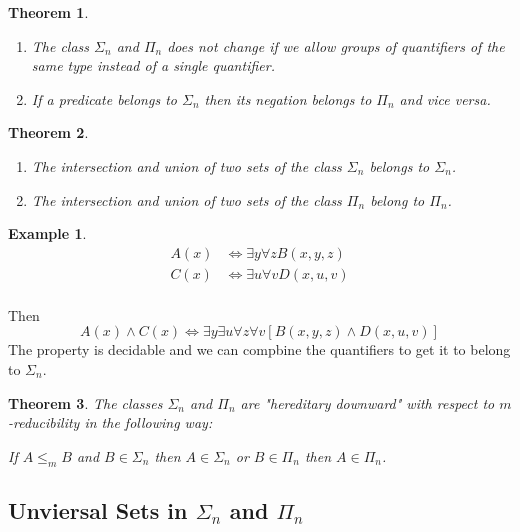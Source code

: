 \documentclass[10pt, letterpaper]{article}
\newtheorem{thm}{Theorem}
\theoremstyle{remark}
\theoremstyle{definition}
\newtheorem{ex}{Example}
\begin{document}
    \begin{thm}
        \begin{enumerate}
            \item[(a)] The class $\Sigma_n$ and $\Pi_n$ does not change if we allow groups of quantifiers of the same type instead 
            of a single quantifier.
            \item[(b)] If a predicate belongs to $\Sigma_n$ then its negation belongs to $\Pi_n$ and vice versa.
        \end{enumerate}
    \end{thm}

    \begin{thm}
        \begin{enumerate}
            \item [(a)] The intersection and union of two sets of the class $\Sigma_n$ belongs to $\Sigma_n$.
            \item [(b)] The intersection and union of two sets of the class $\Pi_n$ belong to $\Pi_n$.
        \end{enumerate}
    \end{thm}

    \begin{ex}
        \begin{align*}
            A(x) &\Leftrightarrow \exists y \forall z B(x,y,z) \\
            C(x) &\Leftrightarrow \exists u \forall v D(x,u,v) \\
        \end{align*}

        Then 
        \[
            A(x) \land C(x) \Leftrightarrow \exists y \exists u \forall z \forall v [B(x,y,z) \land D(x,u,v)]
        \]
        The property is decidable and we can compbine the quantifiers to get it to belong to $\Sigma_n$.
    \end{ex}

    \begin{thm}
        The classes $\Sigma_n$ and $\Pi_n$ are "hereditary downward" with respect to $m$-reducibility in the 
        following way:
        
        If $A \leq_m B$ and $B \in \Sigma_n$ then $A \in \Sigma_n$ or $B \in \Pi_n$ then $A \in \Pi_n$.
    \end{thm}

    \subsection*{Unviersal Sets in $\Sigma_n$ and $\Pi_n$}
\end{document}
